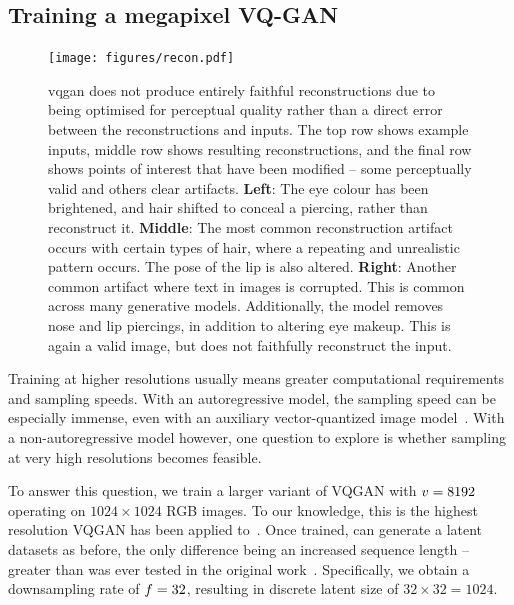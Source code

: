 \subsection{Training a megapixel VQ-GAN}
\label{sec:megagan}

\begin{figure}[ht]
    \centering
    \texttt{[image: figures/recon.pdf]}
    \caption{
        \gls{vqgan} does not produce entirely faithful reconstructions due to
        being optimised for perceptual quality rather than a direct error between
        the reconstructions and inputs. The top row shows example inputs, middle row
        shows resulting reconstructions, and the final row shows points of interest that
        have been modified -- some perceptually valid and others clear
        artifacts. 
        \textbf{Left}: The eye colour has been brightened, and hair
        shifted to conceal a piercing, rather than reconstruct it.
        \textbf{Middle}: The most common reconstruction artifact occurs with
        certain types of hair, where a repeating and unrealistic pattern occurs. The
        pose of the lip is also altered. 
        \textbf{Right}: Another common artifact where text in images is
        corrupted. This is common across many generative models. Additionally,
        the model removes nose and lip piercings, in addition to altering eye
        makeup. This is again a valid image, but does not faithfully reconstruct
        the input.}
\end{figure}

Training at higher resolutions usually means greater computational requirements
and sampling speeds. With an autoregressive model, the sampling speed can be
especially immense, even with an auxiliary vector-quantized image
model~\cite{esser2021taming}. With a non-autoregressive model however, one
question to explore is whether sampling at very high resolutions becomes
feasible.

To answer this question, we train a larger variant of VQGAN with
$v = 8192$ operating on $1024 \times 1024$ RGB images. To our
knowledge, this is the highest resolution VQGAN has been applied
to~\cite{esser2021taming}. Once trained, can generate a latent datasets as
before, the only difference being an increased sequence length -- greater than
was ever tested in the original work~\cite{savinov2022stepunrolled}.
Specifically, we obtain a downsampling rate of $f=32$, resulting
in discrete latent size of $32 \times 32 = 1024$.

